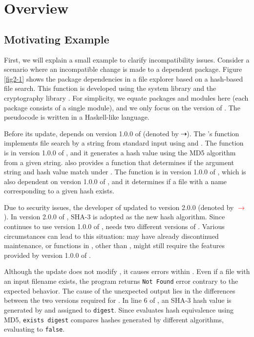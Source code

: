 \section{Overview} %
\label{overview}
\subsection{Motivating Example}
\label{sec:motivatingexample}

First, we will explain a small example to clarify incompatibility issues. Consider a scenario where an incompatible change is made to a dependent package. Figure \ref{fig2-1} shows the package dependencies in a file explorer  based on a hash-based file search. This function is developed using the system library  and the cryptography library . For simplicity, we equate packages and modules here (each package consists of a single module), and we only focus on the version of . The pseudocode is written in a Haskell-like language.

Before its update,  depends on version 1.0.0 of  (denoted by $\dashrightarrow$). The 's  function implements file search by a string from standard input using  and .
The function  is in version 1.0.0 of , and it generates a hash value using the MD5 algorithm from a given string.  also provides a function  that determines if the argument string and hash value match under .
The function  is in version 1.0.0 of , which is also dependent on version 1.0.0 of , and it determines if a file with a name corresponding to a given hash exists. 

Due to security issues, the developer of  updated  to version 2.0.0 (denoted by \textcolor{red}{$\longrightarrow$}). In version 2.0.0 of , SHA-3 is adopted as the new hash algorithm. Since  continues to use version 1.0.0 of ,  needs two different versions of . 
Various circumstances can lead to this situation:  may have already discontinued maintenance, or functions in , other than , might still require the features provided by version 1.0.0 of .

Although the update does not modify , it causes errors within . Even if a file with an input filename exists, the program returns \texttt{Not Found} error contrary to the expected behavior. The cause of the unexpected output lies in the differences between the two versions required for . In line 6 of , an SHA-3 hash value is generated by  and assigned to \texttt{digest}. Since  evaluates hash equivalence using MD5, \texttt{exists digest} compares hashes generated by different algorithms, evaluating to \texttt{false}.

